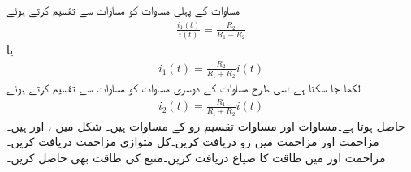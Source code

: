 مساوات  کے پہلی مساوات  کو مساوات  سے تقسیم کرتے ہوئے
\begin{align*}
\frac{i_1(t)}{i(t)}=\frac{R_2}{R_1+R_2}
\end{align*}
یا
\begin{align}\label{مساوات_مزاحمتی_تقسیم_رو_کی_مساوات_الف}
i_1(t)=\frac{R_2}{R_1+R_2} i(t)
\end{align}
لکھا جا سکتا ہے۔اسی طرح مساوات  کے دوسری مساوات  کو مساوات  سے تقسیم کرتے ہوئے
\begin{align}\label{مساوات_مزاحمتی_تقسیم_رو_کی_مساوات_ب}
i_2(t)=\frac{R_1}{R_1+R_2} i(t)
\end{align}
حاصل ہوتا ہے۔مساوات  اور مساوات  تقسیم رو کے مساوات ہیں۔
شکل  میں ،  اور  ہیں۔مزاحمت  اور مزاحمت  میں رو دریافت کریں۔کل متوازی مزاحمت دریافت کریں۔مزاحمت  اور  میں طاقت کا ضیاع دریافت کریں۔منبع کی طاقت بھی حاصل کریں۔

